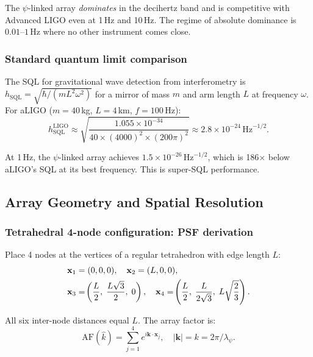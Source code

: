 \documentclass[11pt]{article}
\theoremstyle{definition}
\theoremstyle{remark}
\newcommand{\SQL}{\mathrm{SQL}}
\begin{document}
The $\psi$-linked array \emph{dominates} in the decihertz band and is
competitive with Advanced LIGO even at 1\,Hz and 10\,Hz. The regime
of absolute dominance is $0.01$--$1$\,Hz where no other instrument
comes close.

\subsubsection{Standard quantum limit comparison}

The SQL for gravitational wave detection from interferometry is
$h_{\SQL} = \sqrt{\hbar/(m L^2 \omega^2)}$ for a mirror of mass $m$
and arm length $L$ at frequency $\omega$. For aLIGO ($m = 40$\,kg,
$L = 4$\,km, $f = 100$\,Hz):
\begin{equation}
h_{\SQL}^{\mathrm{LIGO}} \approx \sqrt{\frac{1.055\times10^{-34}}
{40 \times (4000)^2 \times (200\pi)^2}} \approx 2.8\times10^{-24}\,\mathrm{Hz}^{-1/2}.
\end{equation}

At 1\,Hz, the $\psi$-linked array achieves $1.5\times10^{-26}\,\mathrm{Hz}^{-1/2}$,
which is 186$\times$ below aLIGO's SQL at its best frequency. This is
super-SQL performance.

\subsection{Array Geometry and Spatial Resolution}

\subsubsection{Tetrahedral 4-node configuration: PSF derivation}

Place 4 nodes at the vertices of a regular tetrahedron with edge length $L$:
\begin{align}
\mathbf{x}_1 &= (0, 0, 0), \quad
\mathbf{x}_2 = (L, 0, 0), \notag\\
\mathbf{x}_3 &= \!\left(\frac{L}{2},\;\frac{L\sqrt{3}}{2},\; 0\right), \quad
\mathbf{x}_4 = \!\left(\frac{L}{2},\;\frac{L}{2\sqrt{3}},\; L\sqrt{\frac{2}{3}}\right).
\label{eq:tet-positions}
\end{align}

All six inter-node distances equal $L$. The array factor is:
\begin{equation}
\mathrm{AF}(\hat{k}) = \sum_{j=1}^4 e^{i \mathbf{k} \cdot \mathbf{x}_j},
\quad |\mathbf{k}| = k = 2\pi/\lambda_\psi.
\end{equation}
\end{document}
